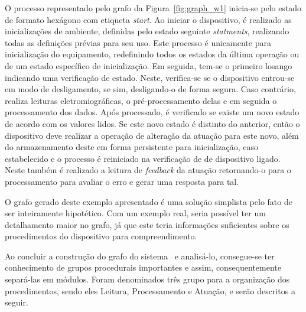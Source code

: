          O processo representado pelo grafo da Figura~\ref{fig:graph_w1} inicia-se pelo estado de formato hexágono com etiqueta \textit{start}.
         Ao iniciar o dispositivo, é realizado as inicializações de ambiente, definidas pelo estado seguinte \textit{statments}, realizando todas as definições prévias para seu uso.
         Este processo é unicamente para inicialização do equipamento, redefinindo todos os estados da última operação ou de um estado específico de inicialização.
         Em seguida, tem-se o primeiro losango indicando uma verificação de estado.
         Neste, verifica-se se o dispositivo entrou-se em modo de desligamento, se sim, desligando-o de forma segura.
         Caso contrário, realiza leituras eletromiográficas, o pré-processamento delas e em seguida o processamento dos dados.
         Após processado, é verificado se existe um novo estado de acordo com os valores lidos.
         Se este novo estado é distinto do anterior, então o dispositivo deve realizar a operação de alteração da atuação para este novo, além do armazenamento deste em forma persistente para inicialização, caso estabelecido e o processo é reiniciado na verificação de de dispositivo ligado.
         Neste também é realizado a leitura de \textit{feedback} da atuação retornando-o para o processamento para avaliar o erro e gerar uma resposta para tal.

         O grafo gerado deste exemplo apresentado é uma solução simplista pelo fato de ser inteiramente hipotético.
         Com um exemplo real, seria possível ter um detalhamento maior no grafo, já que este teria informações suficientes sobre os procedimentos do dispositivo para compreendimento.

         Ao concluir a construção do grafo do sistema \wearable\ e analisá-lo, consegue-se ter conhecimento de grupos procedurais importantes e assim, consequentemente separá-las em módulos.
         Foram denominados três grupo para a organização dos procedimentos, sendo eles Leitura, Processamento e Atuação, e serão descritos a seguir.

